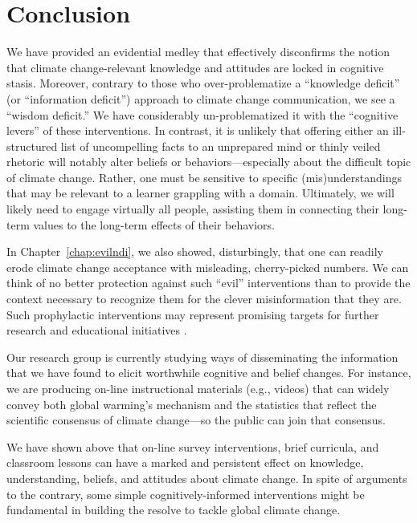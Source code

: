 \graphicspath{{conclusion/}}

\chapter{Conclusion}
\label{chap:conclusion}

We have provided an evidential medley that effectively disconfirms the notion
that climate change-relevant knowledge and attitudes are locked in cognitive
stasis. Moreover, contrary to those who over-problematize a ``knowledge
deficit'' (or ``information deficit'') approach to climate change communication,
we see a ``wisdom deficit.'' We have considerably un-problematized it with the
``cognitive levers'' of these interventions. In contrast, it is unlikely that
offering either an ill-structured list of uncompelling facts to an unprepared
mind or thinly veiled rhetoric \parencite[cf.][]{lord_biased_1979} will notably
alter beliefs or behaviors---especially about the difficult topic of climate
change. Rather, one must be sensitive to specific (mis)understandings that may
be relevant to a learner grappling with a domain.  Ultimately, we will likely
need to engage virtually all people, assisting them in connecting their
long-term values to the long-term effects of their behaviors.

In Chapter~\ref{chap:evilndi}, we also showed, disturbingly, that one can
readily erode climate change acceptance with misleading, cherry-picked numbers.
We can think of no better protection against such ``evil'' interventions than to
provide the context necessary to recognize them for the clever misinformation
that they are. Such prophylactic interventions may represent promising targets
for further research and educational initiatives
\parencite[cf.][]{lewandowsky_misinformation_2012}.

Our research group is currently studying ways of disseminating the information
that we have found to elicit worthwhile cognitive and belief changes.  For
instance, we are producing on-line instructional materials (e.g., videos) that
can widely convey both global warming’s mechanism and the statistics that
reflect the scientific consensus of climate change—so the public can join that
consensus.

We have shown above that on-line survey interventions, brief curricula, and
classroom lessons can have a marked and persistent effect on knowledge,
understanding, beliefs, and attitudes about climate change. In spite of
arguments to the contrary, some simple cognitively-informed interventions might
be fundamental in building the resolve to tackle global climate change.

